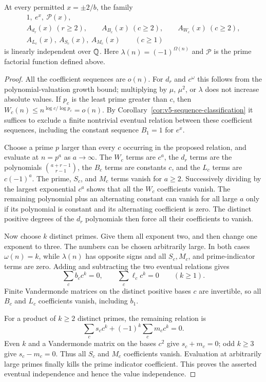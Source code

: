 \begin{theorem}
\label{thm:v5-signed-block}
At every permitted $x=\pm2/b$, the family
\[
\begin{gathered}
 1,\ e^x,\ \mathcal P(x),\\
 A_{d_r}(x)\ (r\geq2),\qquad
 A_{B_c}(x)\ (c\geq2),\qquad A_{W_c}(x)\ (c\geq2),\\
 A_{L_c}(x),\ A_{S_c}(x),\ A_{M_c}(x)\qquad(c\geq1)
\end{gathered}
\]
is linearly independent over $\mathbb Q$.  Here $\lambda(n)=(-1)^{\Omega(n)}$
and $\mathcal P$ is the prime factorial function defined above.
\end{theorem}
\begin{proof}
All the coefficient sequences are $o(n)$.  For $d_r$ and $c^{\omega}$
this follows from the polynomial-valuation growth bound; multiplying by
$\mu$, $\mu^2$, or $\lambda$ does not increase absolute values.
If $p_c$ is the least prime greater than $c$, then
$W_c(n)\leq n^{\log c/\log p_c}=o(n)$.
By Corollary~\ref{cor:v5-sequence-classification} it suffices to exclude
a finite nontrivial eventual relation between these coefficient sequences,
including the constant sequence $B_1=1$ for $e^x$.

Choose a prime $p$ larger than every $c$ occurring in the proposed
relation, and evaluate at $n=p^a$ as $a\to\infty$.
The $W_c$ terms are $c^a$, the $d_r$ terms are the polynomials
$\binom{a+r-1}{r-1}$, the $B_c$ terms are constants $c$, and the
$L_c$ terms are $c(-1)^a$.  The prime, $S_c$, and $M_c$ terms vanish
for $a\geq2$.  Successively dividing by the largest exponential $c^a$
shows that all the $W_c$ coefficients vanish.  The remaining polynomial
plus an alternating constant can vanish for all large $a$ only if its
polynomial is constant and its alternating coefficient is zero.
The distinct positive degrees of the $d_r$ polynomials then force all
their coefficients to vanish.

Now choose $k$ distinct primes.  Give them all exponent two, and then
change one exponent to three.  The numbers can be chosen arbitrarily
large.  In both cases $\omega(n)=k$, while $\lambda(n)$ has opposite
signs and all $S_c,M_c$, and prime-indicator terms are zero.
Adding and subtracting the two eventual relations gives
\[
 \sum_c b_c c^k=0,\qquad \sum_c \ell_c c^k=0\qquad(k\geq1).
\]
Finite Vandermonde matrices on the distinct positive bases $c$ are
invertible, so all $B_c$ and $L_c$ coefficients vanish, including $b_1$.

For a product of $k\geq2$ distinct primes, the remaining relation is
\[
 \sum_c s_c c^k+(-1)^k\sum_c m_c c^k=0.
\]
Even $k$ and a Vandermonde matrix on the bases $c^2$ give $s_c+m_c=0$;
odd $k\geq3$ give $s_c-m_c=0$.  Thus all $S_c$ and $M_c$ coefficients
vanish.  Evaluation at arbitrarily large primes finally kills the prime
indicator coefficient.  This proves the asserted eventual independence
and hence the value independence.
\end{proof}


